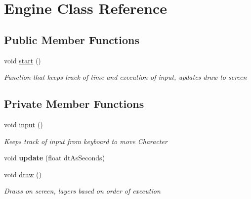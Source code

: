 \hypertarget{class_engine}{}\section{Engine Class Reference}
\label{class_engine}
\subsection*{Public Member Functions}
\begin{DoxyCompactItemize}
\item 
void \mbox{\hyperlink{class_engine_a4d8066dd213a03f5420d1bf60f150ca7}{start}} ()
\begin{DoxyCompactList}\small\item\em Function that keeps track of time and execution of input, updates draw to screen \end{DoxyCompactList}\end{DoxyCompactItemize}
\subsection*{Private Member Functions}
\begin{DoxyCompactItemize}
\item 
void \mbox{\hyperlink{class_engine_ac0b0e464284684e793cec68d41d149b8}{input}} ()
\begin{DoxyCompactList}\small\item\em Keeps track of input from keyboard to move Character \end{DoxyCompactList}\item 
\mbox{\label{class_engine_a8e8463b4122e5fec5eb8ce829279f33d}} 
void {\bfseries update} (float dt\+As\+Seconds)
\item 
void \mbox{\hyperlink{class_engine_a1b654dc41dfbcb5072147f33142b726e}{draw}} ()
\begin{DoxyCompactList}\small\item\em Draws on screen, layers based on order of execution \end{DoxyCompactList}\end{DoxyCompactItemize}
